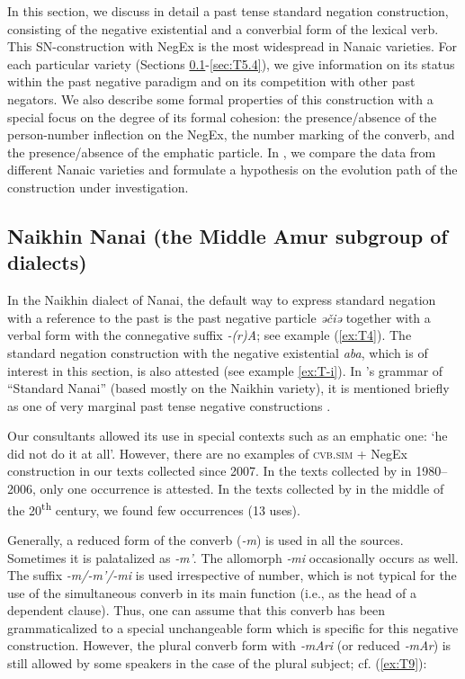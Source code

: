 \documentclass[output=paper,colorlinks,citecolor=brown]{langscibook}
\begin{document}
In this section, we discuss in detail a past tense standard negation construction, consisting of the negative existential and a converbial form of the lexical verb. This SN-construction with NegEx is the most widespread in Nanaic varieties. For each particular variety (Sections \ref{sec:T5.1}-\ref{sec:T5.4}), we give information on its status within the past negative paradigm and on its competition with other past negators. We also describe some formal properties of this construction with a special focus on the degree of its formal cohesion: the presence/absence of the person-number inflection on the NegEx, the number marking of the converb, and the presence/absence of the emphatic particle. In , we compare the data from different Nanaic varieties and formulate a hypothesis on the evolution path of the construction under investigation.

\subsection{Naikhin Nanai (the Middle Amur subgroup of dialects)}\label{sec:T5.1}

In the Naikhin dialect of Nanai, the default way to express standard negation with a reference to the past is the past negative particle \textit{əčiə} together with a verbal form with the connegative suffix \textit{-(r)A}; see example (\ref{ex:T4}). The standard negation construction with the negative existential \textit{aba}, which is of interest in this section, is also attested (see example \ref{ex:T-i}). In \citeauthor{avrorin1961a}’s grammar of “Standard Nanai” (based mostly on the Naikhin variety), it is mentioned briefly as one of very marginal past tense negative constructions \citeyearpar[108]{avrorin1961a}.

Our consultants allowed its use in special contexts such as an emphatic one: ‘he did not do it at all’. However, there are no examples of \textsc{cvb.sim} + NegEx construction in our texts collected since 2007. In the texts collected by \citet{beljdy2012a} in 1980–2006, only one occurrence is attested. In the texts collected by \citet{avrorin1986a} in the middle of the 20\textsuperscript{th} century, we found few occurrences (13 uses).

Generally, a reduced form of the converb (\textit{-m}) is used in all the sources. Sometimes it is palatalized as \textit{‑m'}. The allomorph \textit{‑mi} occasionally occurs as well. The suffix \textit{-m/-m'/-mi} is used irrespective of number, which is not typical for the use of the simultaneous converb in its main function (i.e., as the head of a dependent clause). Thus, one can assume that this converb has been grammaticalized to a special unchangeable form which is specific for this negative construction. However, the plural converb form with \textit{‑mAri} (or reduced \textit{‑mAr}) is still allowed by some speakers in the case of the plural subject; cf. (\ref{ex:T9}):
\end{document}
